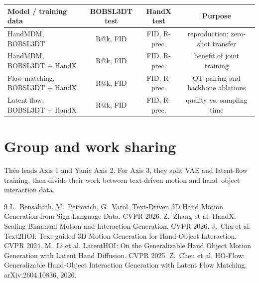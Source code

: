 \documentclass[10pt]{article}
\begin{document}
\par\smallskip
{\centering\small
\begin{tabular}{lccc}
  \toprule
  Model / training data & BOBSL3DT test & HandX test & Purpose \\
  \midrule
  HandMDM, BOBSL3DT & R@k, FID & FID, R-prec. & reproduction; zero-shot transfer \\
  HandMDM, BOBSL3DT + HandX & R@k, FID & FID, R-prec. & benefit of joint training \\
  Flow matching, BOBSL3DT + HandX & R@k, FID & FID, R-prec. & OT pairing and backbone ablations \\
  Latent flow, BOBSL3DT + HandX & R@k, FID & FID, R-prec. & quality vs. sampling time \\
  \bottomrule
\end{tabular}\par}

\section{Group and work sharing}
Théo leads Axis 1 and Yanic Axis 2. For Axis 3, they split VAE and latent-flow training, then divide their work between text-driven motion and hand--object interaction data.


{\footnotesize
\begin{thebibliography}{9}
\setlength{\itemsep}{0pt}
 L.~Bensabath, M.~Petrovich, G.~Varol. Text-Driven 3D Hand Motion Generation from Sign Language Data. CVPR 2026.
 Z.~Zhang et al. HandX: Scaling Bimanual Motion and Interaction Generation. CVPR 2026.
 J.~Cha et al. Text2HOI: Text-guided 3D Motion Generation for Hand-Object Interaction. CVPR 2024.
 M.~Li et al. LatentHOI: On the Generalizable Hand Object Motion Generation with Latent Hand Diffusion. CVPR 2025.
 Z.~Chen et al. HO-Flow: Generalizable Hand-Object Interaction Generation with Latent Flow Matching. arXiv:2604.10836, 2026.
\end{thebibliography}
}
\end{document}
